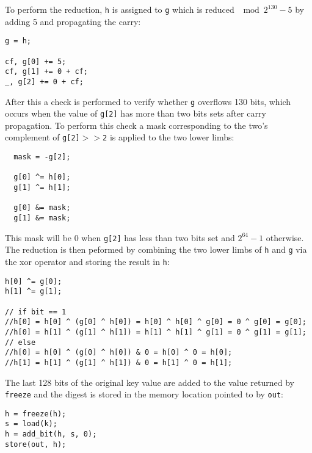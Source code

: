 \documentclass{article}
\begin{document}
To perform the reduction, \texttt{h} is assigned to \texttt{g} which is reduced $\mod 2^{130}-5$ by adding 5 and propagating the carry:
\begin{Verbatim}
g = h;

cf, g[0] += 5;
cf, g[1] += 0 + cf;
_, g[2] += 0 + cf;
\end{Verbatim}
After this a check is performed to verify whether \texttt{g} overflows 130 bits, which occurs when the value of \texttt{g[2]} has more than two bits sets after 
carry propagation. To perform this check a mask corresponding to the two's complement of \texttt{g[2]$>>$2} is applied to the two lower limbs: 
\begin{Verbatim}
  mask = -g[2];

  g[0] ^= h[0];
  g[1] ^= h[1];

  g[0] &= mask;
  g[1] &= mask;
\end{Verbatim}
This mask will be $0$ when \texttt{g[2]} has less than two bits set and $2^{64}-1$ otherwise. The reduction is then peformed by combining the two lower limbs 
of \texttt{h} and \texttt{g} via the xor operator and storing the result in \texttt{h}:
\begin{Verbatim}
h[0] ^= g[0]; 
h[1] ^= g[1];

// if bit == 1
//h[0] = h[0] ^ (g[0] ^ h[0]) = h[0] ^ h[0] ^ g[0] = 0 ^ g[0] = g[0];
//h[0] = h[1] ^ (g[1] ^ h[1]) = h[1] ^ h[1] ^ g[1] = 0 ^ g[1] = g[1];
// else
//h[0] = h[0] ^ (g[0] ^ h[0]) & 0 = h[0] ^ 0 = h[0];
//h[1] = h[1] ^ (g[1] ^ h[1]) & 0 = h[1] ^ 0 = h[1];
\end{Verbatim}
The last 128 bits of the original key value are added to the value returned by \texttt{freeze} and the digest is stored in the memory location pointed to by 
\texttt{out}:
\begin{Verbatim}
h = freeze(h);
s = load(k);
h = add_bit(h, s, 0);
store(out, h);
\end{Verbatim}
\end{document}
